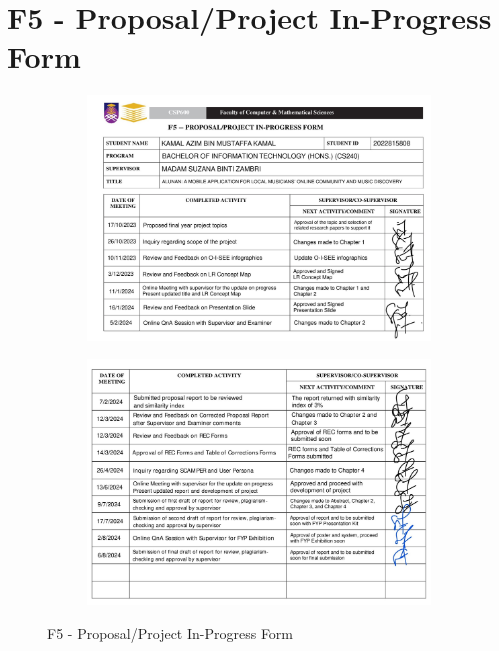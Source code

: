 \chapter{F5 - Proposal/Project In-Progress Form}
\begin{figure}[h]
    \centering
    \begin{subfigure}[b]{0.85\textwidth}
        \centering
        \includegraphics[width=\textwidth]{appendices/forms/f5a.jpg}
        \label{fig:sub1}
    \end{subfigure}
    \hspace{0.08\textwidth}
    \begin{subfigure}[b]{0.85\textwidth}
        \centering
        \includegraphics[width=\textwidth]{appendices/forms/f5b.jpg}
        \label{fig:sub2}
    \end{subfigure}
    \caption{F5 - Proposal/Project In-Progress Form}
    \label{fig:myfig84}
\end{figure}
\clearpage
